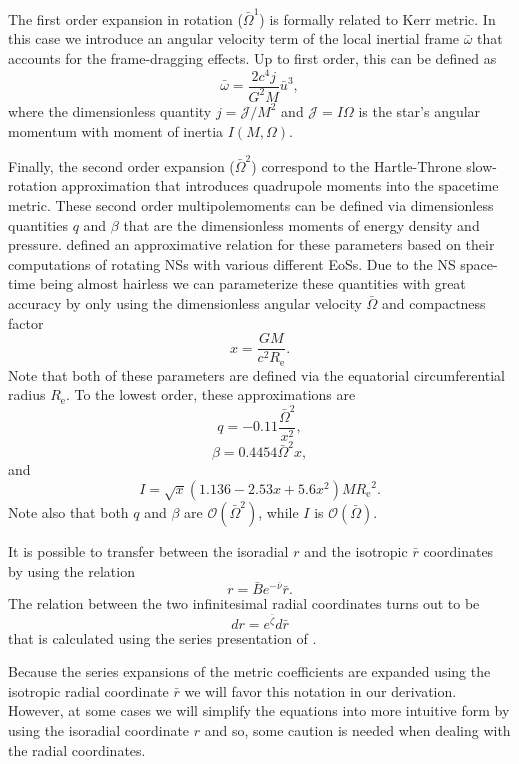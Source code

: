 \documentclass[iop, usenatbib]{emulateapj}
\newcommand{\be}{\begin{equation}}
\newcommand{\ee}{\end{equation}}
\newcommand{\Req}{\ensuremath{R_{\mathrm{e}}}}
\newcommand{\rb}{\ensuremath{\bar{r}}}
\renewcommand{\ub}{\ensuremath{\bar{u}}}
\newcommand{\wb}{\ensuremath{\bar{\omega}}}
\newcommand{\Ob}{\ensuremath{\bar{\Omega}}}
\newcommand{\nub}{\ensuremath{\bar{\nu}}}
\newcommand{\zetab}{\ensuremath{\bar{\zeta}}}
\newcommand{\Bb}{\ensuremath{\bar{B}}}
\begin{document}
The first order expansion in rotation ($\Ob^1$) is formally related to Kerr metric.
In this case we introduce an angular velocity term of the local inertial frame $\wb$ that accounts for the frame-dragging effects.
Up to first order, this can be defined as
\be
\wb = \frac{2c^4j}{G^2M}\ub^3,
\ee
where the dimensionless quantity $j=\mathcal{J}/M^2$ and $\mathcal{J} = I \Omega$ is the star's angular momentum with moment of inertia $I(M,\Omega)$.

Finally, the second order expansion ($\Ob^2$) correspond to the Hartle-Throne slow-rotation approximation that introduces quadrupole moments into the spacetime metric.
These second order multipolemoments can be defined via dimensionless quantities $q$ and $\beta$ that are the dimensionless moments of energy density and pressure.
\citet{aGM14} defined an approximative relation for these parameters based on their computations of rotating NSs with various different EoSs.
Due to the NS space-time being almost hairless we can parameterize these quantities with great accuracy by only using the dimensionless angular velocity $\Ob$ and compactness factor
\be
x = \frac{G M}{c^2 \Req}.
\ee
Note that both of these parameters are defined via the equatorial circumferential radius \Req.
To the lowest order, these approximations are
\be
q = -0.11 \frac{\Ob^2}{x^2},
\ee
\be
\beta = 0.4454 \Ob^2 x,
\ee
and
\be
I = \sqrt{x} (1.136 - 2.53 x + 5.6 x^2) M \Req^2.
\ee
Note also that both $q$ and $\beta$ are $\mathcal{O}(\Ob^2)$, while $I$ is $\mathcal{O}(\Ob)$.
    
It is possible to transfer between the isoradial $r$ and the isotropic $\rb$ coordinates by using the relation \citep{FIP86}
\be
r = \Bb e^{-\nub} \rb.
\ee
The relation between the two infinitesimal radial coordinates turns out to be
\be
dr = e^{\zetab} d\rb
\ee
that is calculated using the series presentation of \cite{BI76}.

Because the series expansions of the metric coefficients are expanded using the isotropic radial coordinate $\rb$ we will favor this notation in our derivation.
However, at some cases we will simplify the equations into more intuitive form by using the isoradial coordinate $r$ and so, some caution is needed when dealing with the radial coordinates.

\end{document}
